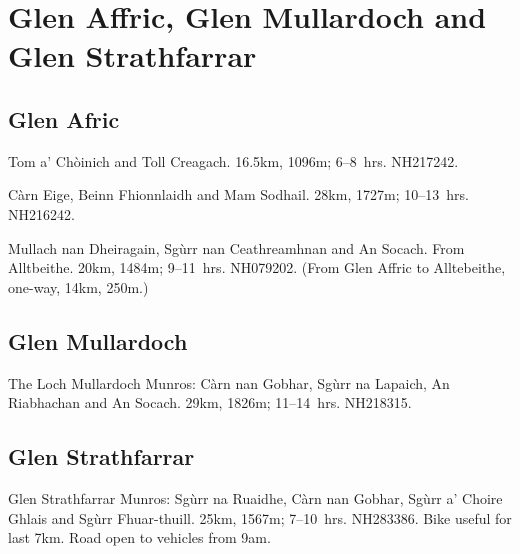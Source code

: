 \section{Glen Affric, Glen Mullardoch and Glen Strathfarrar}


\subsection{Glen Afric}

\begin{munros}
\item
Tom a' Chòinich and Toll Creagach.  16.5km, 1096m; 6--8~hrs.  NH217242.  \tick

\item
Càrn Eige, Beinn Fhionnlaidh and Mam Sodhail.  28km, 1727m; 10--13~hrs.
NH216242.  \tick

\item
Mullach nan Dheiragain, Sgùrr nan Ceathreamhnan and An Socach.  From
Alltbeithe.  20km, 1484m; 9--11~hrs.  NH079202. (From Glen Affric to
Alltebeithe, one-way, 14km, 250m.)  \tick
\end{munros}


\subsection{Glen Mullardoch}

\begin{munros}
\item
The Loch Mullardoch Munros: Càrn nan Gobhar, Sgùrr na Lapaich, An Riabhachan
and An Socach.  29km, 1826m; 11--14~hrs.  NH218315.  \tick
\end{munros}


\subsection{Glen Strathfarrar}

\begin{munros}
\item
Glen Strathfarrar Munros: Sgùrr na Ruaidhe, Càrn nan Gobhar, Sgùrr a' Choire
Ghlais and Sgùrr Fhuar-thuill.  25km, 1567m; 7--10~hrs.  NH283386.  Bike
useful for last 7km.  Road open to vehicles from 9am.  \tick
\end{munros}

